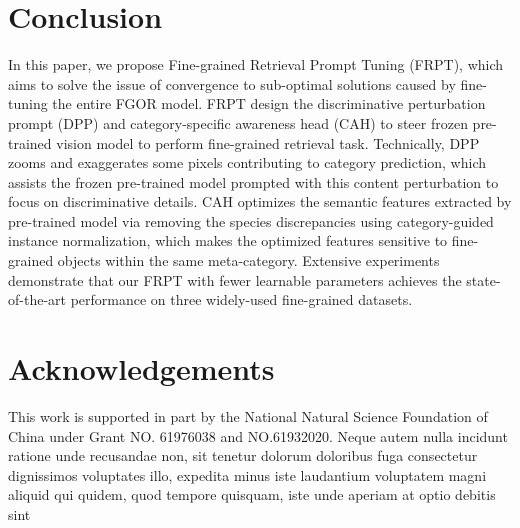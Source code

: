 \documentclass[letterpaper]{article} %
\begin{document}
\section{Conclusion}
In this paper, we propose Fine-grained Retrieval Prompt Tuning (FRPT), which aims to solve the issue of convergence to sub-optimal solutions caused by fine-tuning the entire FGOR model. FRPT design the discriminative perturbation prompt (DPP) and category-specific awareness head (CAH) to steer frozen pre-trained vision model to perform fine-grained retrieval task.
Technically, DPP zooms and exaggerates some pixels contributing to category prediction, which assists the frozen pre-trained model prompted with this content perturbation to focus on discriminative details.
CAH optimizes the semantic features extracted by pre-trained model via removing the species discrepancies using category-guided instance normalization,  which makes the optimized features sensitive to fine-grained objects within the same meta-category.
Extensive experiments demonstrate that our FRPT with fewer learnable parameters achieves the state-of-the-art performance on three widely-used fine-grained datasets.
\section*{Acknowledgements}
This work is supported in part by the National Natural Science Foundation of China under Grant NO. 61976038 and NO.61932020.
Neque autem nulla incidunt ratione unde recusandae non, sit tenetur dolorum doloribus fuga consectetur dignissimos voluptates illo, expedita minus iste laudantium voluptatem magni aliquid qui quidem, quod tempore quisquam, iste unde aperiam at optio debitis sint

\end{document}
